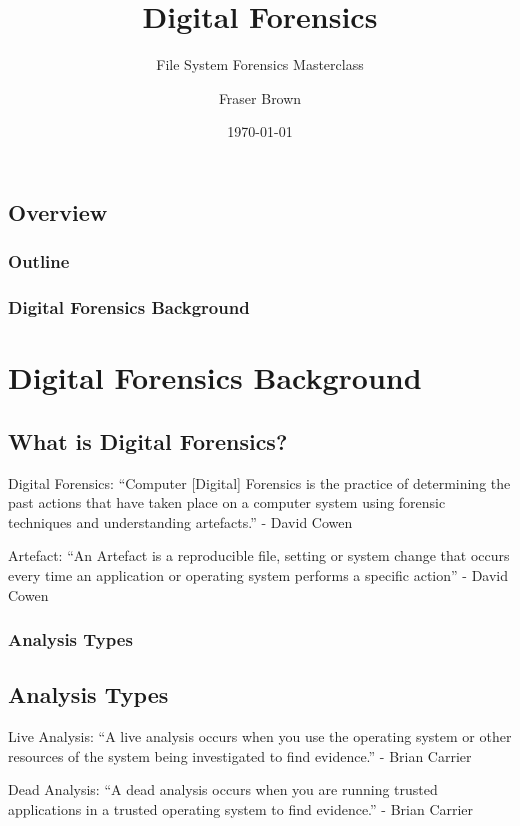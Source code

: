 \documentclass{beamer}
\title{Digital Forensics}
\subtitle{File System Forensics Masterclass}
\author{Fraser Brown}
\institute{Heriot-Watt University}
\date{\today}
\begin{document}
\begin{frame}
\titlepage
\end{frame}

\begin{frame}[shrink]
\section{Overview}
\frametitle{Outline}
\tableofcontents
\end{frame}

\begin{frame}
	\frametitle{Digital Forensics Background}
	\section{Digital Forensics Background}
		\subsection{What is Digital Forensics?}
		\begin{block}{Digital Forensics:}
			``Computer [Digital] Forensics is the practice of determining the past actions that have taken place on a computer system using forensic techniques and understanding artefacts.'' - David Cowen
		\end{block}
		
		\begin{block}{Artefact:}
			``An Artefact is a reproducible file, setting or system change that occurs every time an application or operating system performs a specific action'' - David Cowen
		\end{block}
\end{frame}

\begin{frame}
	\frametitle{Analysis Types}
	\subsection{Analysis Types}
	\begin{block}{Live Analysis:}
		``A live analysis occurs when you use the operating system or other resources of the system being investigated to find evidence.'' - Brian Carrier
	\end{block}

	\begin{block}{Dead Analysis:}
		``A dead analysis occurs when you are running trusted applications in a trusted operating system to find evidence.'' - Brian Carrier
	\end{block}
\end{frame}
\end{document}
